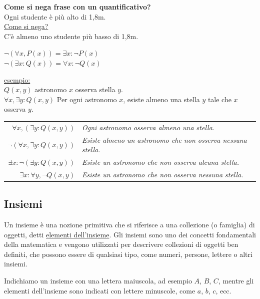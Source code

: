     \vspace{1em}
    \textbf{Come si nega frase con un quantificativo?}  \\
    Ogni studente è più alto di 1,8m.   \\
    \underline{Come si nega?}   \\
    C'è almeno uno studente più basso di 1,8m.  \\
    \begin{center}
        \(\neg(\forall x,P(x))=\exists x:\neg P(x)\)    \\
        \(\neg(\exists x:Q(x))=\forall x:\neg Q(x)\)    
    \end{center}

    \underline{esempio:}    \\
    $Q(x,y)$ astronomo $x$ osserva stella $y$.  \\
    \(\forall x, \exists y:Q(x,y)\) Per ogni astronomo $x$, esiste almeno una stella $y$ tale che $x$ osserva $y$.
        
    \begin{center}
        \begin{tabular}{r l}
            \(\forall x,(\exists y: Q(x,y))\) & \textit{Ogni astronomo osserva almeno una stella.} \\
            \(\neg (\forall x,\exists y: Q(x,y))\) & \textit{Esiste almeno un astronomo che non osserva nessuna stella.} \\
            \(\exists x:\neg(\exists y:Q(x,y))\) & \textit{Esiste un astronomo che non osserva alcuna stella.} \\
            \(\exists x: \forall y, \neg Q(x,y)\) & \textit{Esiste un astronomo che non osserva nessuna stella.}
        \end{tabular}
    \end{center}

\newpage
\subsection{Insiemi}
Un insieme è una nozione primitiva che si riferisce a una collezione (o famiglia) di oggetti, detti \underline{elementi dell'insieme}. Gli insiemi sono uno dei concetti fondamentali della matematica e vengono utilizzati per descrivere collezioni di oggetti ben definiti, che possono essere di qualsiasi tipo, come numeri, persone, lettere o altri insiemi.

Indichiamo un insieme con una lettera maiuscola, ad esempio \( A \), \( B \), \( C \), mentre gli elementi dell'insieme sono indicati con lettere minuscole, come \( a \), \( b \), \( c \), ecc.

